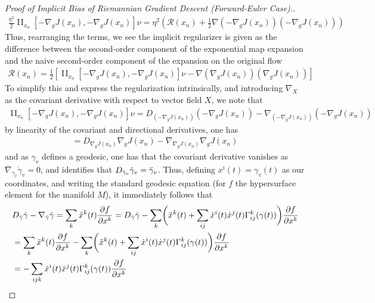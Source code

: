 \documentclass[reqno,11pt,letterpaper]{amsart}
\theoremstyle{plain}
\theoremstyle{definition}
\theoremstyle{remark}
\DeclareMathOperator{\II}{\mathrm{I\!I}}
\newcommand{\rgrad}{\nabla_{\!g}}
\newcommand{\Fimp}{\mathcal{R}}
\begin{document}
\begin{proof}[Proof of Implicit Bias of Riemannian Gradient Descent (Forward-Euler Case).]
\begin{align*}
    \frac{\eta^{2}}{2} \II_{x_{n}}[- \rgrad J (x_{n}), - \rgrad J (x_{n})] \nu = \eta^{2} \left( \Fimp (x_{n}) + \frac{1}{2} \nabla (-\rgrad J(x_{n})) (- \rgrad J(x_{n}))
    \right)
\end{align*}
Thus, rearranging the terms, we see the implicit regularizer is given as the difference between the second-order component of the exponential map expansion and the naive second-order component of the expansion on the original flow
\begin{align*}
    \Fimp (x_{n})  = \frac{1}{2} \left[ \II_{x_{n}}[- \rgrad J (x_{n}), - \rgrad J (x_{n})]\nu - \nabla (\rgrad J(x_{n})) (\rgrad J(x_{n})) \right] 
\end{align*}
To simplify this and express the regularization intrinsically, and introducing $\nabla_{X}$ as the covariant derivative with respect to vector field $X$, we note that
\begin{align*}
    \II_{x_{n}}[- \rgrad J (x_{n}), - \rgrad J (x_{n})]\nu = D_{(- \rgrad J (x_{n}))} {(- \rgrad J (x_{n}))} - \nabla_{(- \rgrad J (x_{n}))} (- \rgrad J (x_{n}))
\end{align*}
by linearity of the covariant and directional derivatives, one has
\begin{align*}
    = D_{\rgrad J (x_{n})} { \rgrad J (x_{n})} - \nabla_{\rgrad J (x_{n})} \rgrad J (x_{n})
\end{align*}
and as $\gamma_{v}$ defines a geodesic, one has that the covariant derivative vanishes as $\nabla_{\dot{\gamma}_{v}} \dot{\gamma}_{v} = 0$, and identifies that $D_{\Dot{\gamma}_{v}} \Dot{\gamma}_{v} = \Ddot{\gamma}_{v}$. Thus, defining $x^{i}(t) = \gamma_{v}(t)$ as our coordinates, and writing the standard geodesic equation (for $f$ the hypersurface element for the manifold $M$), it immediately follows that
\begin{align*}
    & D_{\Dot{\gamma}} \Dot{\gamma} - \nabla_{\Dot{\gamma}} \Dot{\gamma} = \sum_{k} \Ddot{x}^{k}(t) \frac{\partial f}{\partial x^{k}} =D_{\Dot{\gamma}} \Dot{\gamma} - \sum_{k} \biggl( \Ddot{x}^{k}(t) + \sum_{ij} \Dot{x}^{i} (t) \Dot{x}^{j}(t) \Gamma_{ij}^{k}(\gamma(t)) \biggr) \frac{\partial f}{\partial x^{k}} \\
    & =\sum_{k} \Ddot{x}^{k}(t) \frac{\partial f}{\partial x^{k}} - \sum_{k} \biggl( \Ddot{x}^{k}(t) + \sum_{ij} \Dot{x}^{i} (t) \Dot{x}^{j}(t) \Gamma_{ij}^{k}(\gamma(t)) \biggr) \frac{\partial f}{\partial x^{k}} \\
    & = - \sum_{ijk} \Dot{x}^{i} (t) \Dot{x}^{j}(t) \Gamma_{ij}^{k}(\gamma(t)) \frac{\partial f}{\partial x^{k}} 

\end{align*}
\end{proof}
\end{document}
